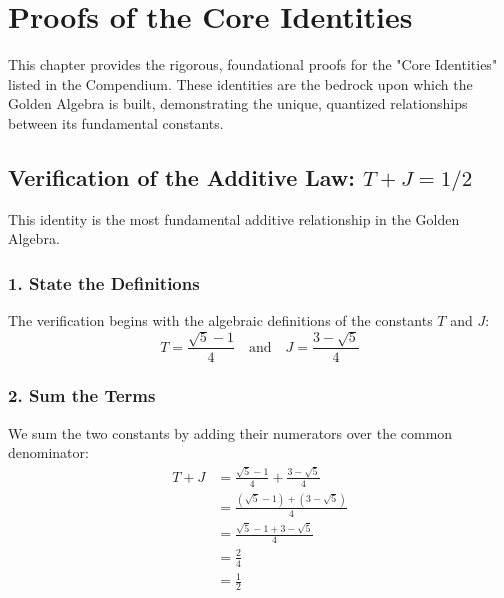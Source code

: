 

\section{Proofs of the Core Identities}
\label{sec:core_identities}

This chapter provides the rigorous, foundational proofs for the "Core Identities" listed in the Compendium. These identities are the bedrock upon which the Golden Algebra is built, demonstrating the unique, quantized relationships between its fundamental constants.
\newpage
\subsection{Verification of the Additive Law: \texorpdfstring{\(T + J = 1/2\)}{T + J = 1/2}}
This identity is the most fundamental additive relationship in the Golden Algebra.

\subsubsection*{1. State the Definitions}
The verification begins with the algebraic definitions of the constants $T$ and $J$:
$$ T = \frac{\sqrt{5}-1}{4} \quad \text{and} \quad J = \frac{3-\sqrt{5}}{4} $$

\subsubsection*{2. Sum the Terms}
We sum the two constants by adding their numerators over the common denominator:
\begin{align*}
T + J &= \frac{\sqrt{5}-1}{4} + \frac{3-\sqrt{5}}{4} \\
&= \frac{(\sqrt{5}-1) + (3-\sqrt{5})}{4} \\
&= \frac{\sqrt{5} - 1 + 3 - \sqrt{5}}{4} \\
&= \frac{2}{4} \\
&= \frac{1}{2}
\end{align*}

